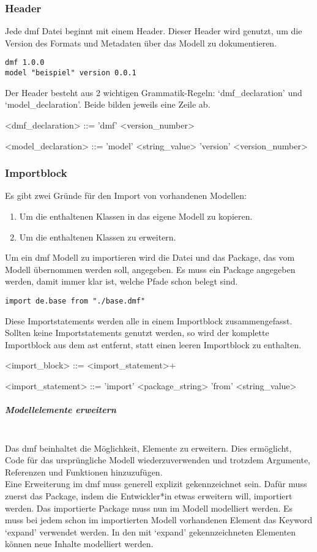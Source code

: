 \documentclass[./einleitung.tex]{subfiles}
\begin{document}
\subsubsection{Header}
Jede \acrshort{dmf} Datei beginnt mit einem Header.
Dieser Header wird genutzt, um die Version des Formats und Metadaten über das Modell zu dokumentieren.
\begin{lstlisting}[caption={Header einer \acrshort{dmf}-Modelldatei}]
dmf 1.0.0
model "beispiel" version 0.0.1
\end{lstlisting}
Der Header besteht aus 2 wichtigen Grammatik-Regeln: `dmf_declaration' und `model_declaration'.
Beide bilden jeweils eine Zeile ab.

\begin{grammar}
<dmf_declaration> ::= 'dmf' <version_number>

<model_declaration> ::= 'model' <string_value> 'version' <version_number>
\end{grammar}

\subsubsection{Importblock}
Es gibt zwei Gründe für den Import von vorhandenen Modellen:
\begin{enumerate}
\item Um die enthaltenen Klassen in das eigene Modell zu kopieren.
\item Um die enthaltenen Klassen zu erweitern.
\end{enumerate}
Um ein \acrshort{dmf} Modell zu importieren wird die Datei und das Package, das vom Modell übernommen werden soll, angegeben.
Es muss ein Package angegeben werden, damit immer klar ist, welche Pfade schon belegt sind.
\begin{lstlisting}[caption={Import des Package de.base}]
import de.base from "./base.dmf"
\end{lstlisting}
Diese Importstatements werden alle in einem Importblock zusammengefasst.
Sollten keine Importstatements genutzt werden, so wird der komplette Importblock aus dem \acrshort{ast} entfernt, statt einen leeren Importblock zu enthalten.
\begin{grammar}
<import_block> ::= <import_statement>+

<import_statement> ::= 'import' <package_string> 'from' <string_value>
\end{grammar}

\subparagraph{Modellelemente erweitern}\mbox{}\\
Das \acrshort{dmf} beinhaltet die Möglichkeit, Elemente zu erweitern.
Dies ermöglicht, Code für das ursprüngliche Modell wiederzuverwenden und trotzdem Argumente, Referenzen und Funktionen hinzuzufügen. \\
Eine Erweiterung im \acrshort{dmf} muss generell explizit gekennzeichnet sein.
Dafür muss zuerst das Package, indem die Entwickler*in etwas erweitern will, importiert werden.
Das importierte Package muss nun im Modell modelliert werden.
Es muss bei jedem schon im importierten Modell vorhandenen Element das Keyword `expand' verwendet werden.
In den mit `expand' gekennzeichneten Elementen können neue Inhalte modelliert werden.
\end{document}
